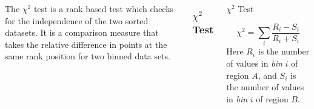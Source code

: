 \documentclass[9pt]{beamer}
\begin{document}
\begin{frame}
\begin{columns}
The $\chi^{2}$ test is a rank based test which checks for the independence of the two sorted datasets. It is a comparison measure that takes the relative difference in points at the same rank position for two binned data sets.
\frametitle{$\chi^{2}$ Test}
\begin{block}{$\chi^{2}$ Test}

\begin{equation}
\chi^{2} = \sum_{i} \frac{R_{i}-S_{i}}{R_{i} + S_{i}}
\end{equation}
Here $R_{i}$ is the number of values in \textit{bin} $i$ of region $A$, and $S_{i}$ is the number of values in  \textit{bin} $i$ of region $B$.
\end{block}
\end{columns}
\end{frame}
\end{document}
